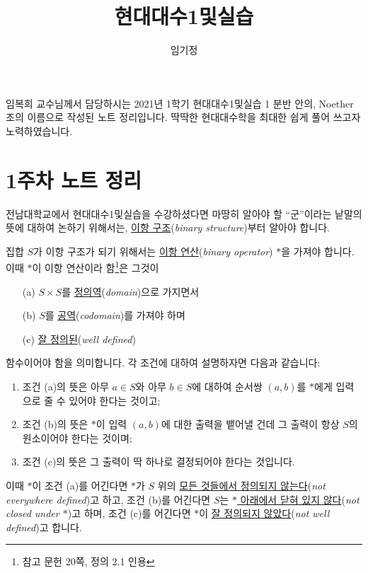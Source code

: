 \documentclass[12pt]{paper}
\title{현대대수1및실습}
\author{임기정}
\begin{document}
  \nocite{fraleigh2009}

  \maketitle
  \hspace{12pt}
  
  임복희 교수님께서 담당하시는 2021년 1학기 현대대수1및실습 1 분반 안의, Noether 조의 이름으로 작성된 노트 정리입니다.
  딱딱한 현대대수학을 최대한 쉽게 풀어 쓰고자 노력하였습니다.

  \section{1주차 노트 정리}
  \hspace{12pt}

  전남대학교에서 현대대수1및실습을 수강하셨다면 마땅히 알아야 할 ``군''이라는 낱말의 뜻에 대하여 논하기 위해서는, \underline{이항 구조}(\textit{binary structure})부터 알아야 합니다.

  집합 $S$가 이항 구조가 되기 위해서는 \underline{이항 연산}(\textit{binary operator}) $*$을 가져야 합니다.
  이때 $*$이 이항 연산이라 함\footnote{참고 문헌 \cite{fraleigh2009} 20쪽, 정의 2.1 인용}은 그것이
  \begin{enumerate}
    \item[(a)] $S \times S$를 \underline{정의역}(\textit{domain})으로 가지면서
    \item[(b)] $S$를 \underline{공역}(\textit{codomain})를 가져야 하며
    \item[(c)] \underline{잘 정의된}(\textit{well defined}) 
  \end{enumerate}
  함수이어야 함을 의미합니다.
  각 조건에 대하여 설명하자면 다음과 같습니다:
  \begin{enumerate}
    \item 조건 (a)의 뜻은 아무 $a \in S$와 아무 $b \in S$에 대하여 순서쌍 $\left( a , b \right)$를 $*$에게 입력으로 줄 수 있어야 한다는 것이고;
    \item 조건 (b)의 뜻은 $*$이 입력 $\left( a , b \right)$에 대한 출력을 뱉어낼 건데 그 출력이 항상 $S$의 원소이어야 한다는 것이며;
    \item 조건 (c)의 뜻은 그 출력이 딱 하나로 결정되어야 한다는 것입니다.
  \end{enumerate}
  
  이때 $*$이 조건 (a)를 어긴다면 $*$가 $S$ 위의 \underline{모든 것들에서 정의되지 않는다}(\textit{not everywhere defined})고 하고,
  조건 (b)를 어긴다면 $S$는 \underline{$*$ 아래에서 닫혀 있지 않다}(\textit{not closed under $*$})고 하며,
  조건 (c)를 어긴다면 $*$이 \underline{잘 정의되지 않았다}(\textit{not well defined})고 합니다.
\end{document}
